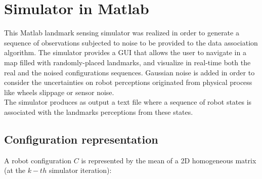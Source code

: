 \section{Simulator in Matlab}\label{sec:matlab_simulator}

This Matlab landmark sensing simulator was realized in order to generate a sequence of observations subjected to noise to be provided to the data association algorithm.
The simulator provides a GUI that allows the user to navigate in a map filled with randomly-placed landmarks, and visualize in real-time both the real 
and the noised configurations sequences. Gaussian noise is added in order to consider the uncertainties on robot perceptions originated from physical process
like wheels slippage or sensor noise.\\
The simulator produces as output a text file where a sequence of robot states is associated with the landmarks perceptions from these states.

\subsection{Configuration representation}
A robot configuration $C$ is represented by the mean of a 2D homogeneous matrix (at the $k-th$ simulator iteration):

